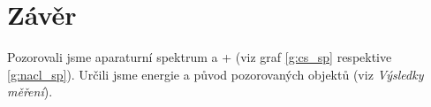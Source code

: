 \section*{Závěr}
Pozorovali jsme aparaturní spektrum  a + (viz graf \ref{g:cs_sp} respektive \ref{g:nacl_sp}). Určili jsme energie a původ pozorovaných objektů (viz \emph{Výsledky měření}).